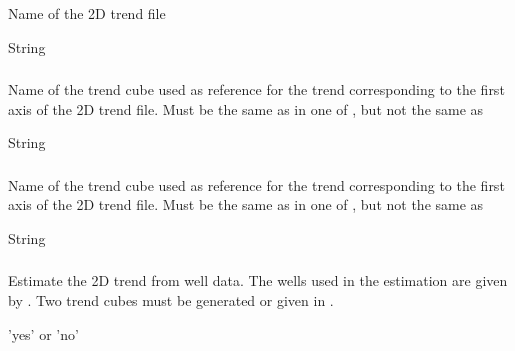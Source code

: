 {\subsubsection{}
 \slist
   \item \Description Name of the 2D trend file
   \item \Argument String
   \item \Default 
 \elist

\subsubsection{}
 \slist
   \item \Description Name of the trend cube used as reference for the trend corresponding to the first axis of the 2D trend file. Must be the same as  in one of , but not the same as 
   \item \Argument String
   \item \Default 
 \elist

\subsubsection{}
 \slist
   \item \Description  Name of the trend cube used as reference for the trend corresponding to the first axis of the 2D trend file. Must be the same as  in one of , but not the same as 
   \item \Argument String
   \item \Default 
 \elist

\subsubsection{}
 \slist
   \item \Description Estimate the 2D trend from well data. The wells used in the estimation are given by . Two trend cubes must be generated or given in .
   \item \Argument 'yes' or 'no'
   \item \Default 
 \elist

}

